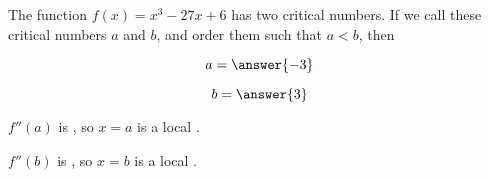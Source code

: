\documentclass{ximera}
\author{Steven Gubkin}
\begin{document}
\begin{exercise}

The function $f(x) = x^3-27x+6$ has two critical numbers.  If we call
these critical numbers $a$ and $b$, and order them such that $a < b$,
then

$$
a = \answer{-3}
$$

$$
b=\answer{3}
$$

$f''(a)$ is , so $x=a$ is a local .

$f''(b)$ is , so $x=b$ is a local .




\end{exercise}
\end{document}
